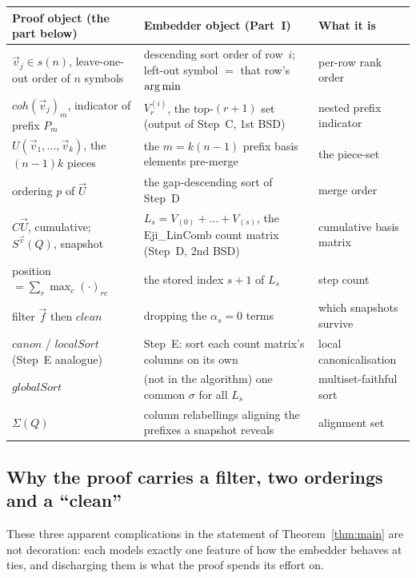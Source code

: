 \begin{center}
\small
\setlength{\tabcolsep}{6pt}
\renewcommand{\arraystretch}{1.3}
\begin{tabular}{@{}p{6.1cm}p{5.0cm}p{3.6cm}@{}}
\toprule
\textbf{Proof object (the part below)} & \textbf{Embedder object (Part~I)} & \textbf{What it is} \\
\midrule
$\vec v_j\in s(n)$, leave-one-out order of $n$ symbols
  & descending sort order of row~$i$; left-out symbol $=$ that row's $\operatorname*{arg\,min}$
  & per-row rank order \\
$coh(\vec v_j)_m$, indicator of prefix $P_m$
  & $V^{(i)}_{r}$, the top-$(r{+}1)$ set (output of Step~C, 1st BSD)
  & nested prefix indicator \\
$U(\vec v_1,\dots,\vec v_k)$, the $(n{-}1)k$ pieces
  & the $m=k(n{-}1)$ prefix basis elements pre-merge
  & the piece-set \\
ordering $p$ of $\vec U$
  & the gap-descending sort of Step~D
  & merge order \\
$C\vec U$, cumulative; $S^{\vec v}(Q)$, snapshot
  & $L_s=V_{(0)}+\dots+V_{(s)}$, the Eji\_LinComb count matrix (Step~D, 2nd BSD)
  & cumulative basis matrix \\
position $=\sum_r\max_c(\cdot)_{rc}$
  & the stored index $s{+}1$ of $L_s$
  & step count \\
filter $\vec f$ then $clean$
  & dropping the $\alpha_s=0$ terms
  & which snapshots survive \\
$canon$ / $localSort$ (Step~E analogue)
  & Step~E: sort each count matrix's columns on its own
  & local canonicalisation \\
$globalSort$
  & (not in the algorithm) one common $\sigma$ for all $L_s$
  & multiset-faithful sort \\
$\Sigma(Q)$
  & column relabellings aligning the prefixes a snapshot reveals
  & alignment set \\
\bottomrule
\end{tabular}
\end{center}

\subsection*{Why the proof carries a filter, two orderings and a ``clean''}

These three apparent complications in the statement of Theorem~\ref{thm:main}
are not decoration: each models exactly one feature of how the embedder behaves
at ties, and discharging them is what the proof spends its effort on.

